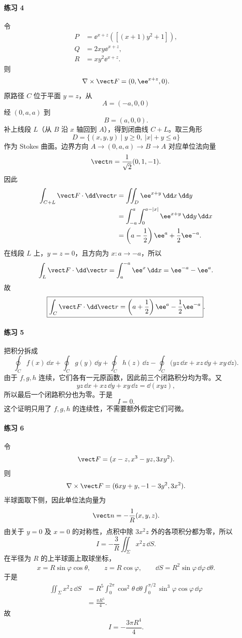 \paragraph{练习 4}
\begin{xsolution}
令
\[
\begin{aligned}
P&=\ee^{x+z}([(x+1)y^2+1]),\\
Q&=2xy\ee^{x+z},\\
R&=xy^2\ee^{x+z}.
\end{aligned}
\]
则
\[
  \nabla\times\vect F=(0,\ee^{x+z},0).
\]
原路径 $C$ 位于平面 $y=z$，从
\[
  A=(-a,0,0)
\]
经 $(0,a,a)$ 到
\[
  B=(a,0,0).
\]
补上线段 $L$（从 $B$ 沿 $x$ 轴回到 $A$），得到闭曲线 $C+L$。取三角形
\[
  D=\{(x,y,y)\mid y\ge0,\ |x|+y\le a\}
\]
作为 Stokes 曲面。边界方向 $A\to(0,a,a)\to B\to A$ 对应单位法向量
\[
  \vect n=\frac1{\sqrt2}(0,1,-1).
\]
因此
\begin{align*}
\int_{C+L}\vect F\cdot\dd\vect r
&=\iint_D\ee^{x+y}\,\dd x\,\dd y\\
&=\int_{-a}^{a}\int_0^{a-|x|}\ee^{x+y}\,\dd y\,\dd x\\
&=\left(a-\frac12\right)\ee^a+\frac12\ee^{-a}.
\end{align*}
在线段 $L$ 上，$y=z=0$，且方向为 $x:a\to-a$，所以
\[
  \int_L\vect F\cdot\dd\vect r
  =\int_a^{-a}\ee^x\,\dd x=\ee^{-a}-\ee^a.
\]
故
\[
  \boxed{
  \int_C\vect F\cdot\dd\vect r
  =\left(a+\frac12\right)\ee^a-\frac12\ee^{-a}}.
\]
\end{xsolution}

\paragraph{练习 5}
\begin{xsolution}
把积分拆成
\[
\oint_C f(x)\,\dd x+\oint_C g(y)\,\dd y+\oint_C h(z)\,\dd z
-\oint_C\bigl(yz\,\dd x+xz\,\dd y+xy\,\dd z\bigr).
\]
由于 $f,g,h$ 连续，它们各有一元原函数，因此前三个闭路积分均为零。又
\[
  yz\,\dd x+xz\,\dd y+xy\,\dd z=\dd(xyz),
\]
所以最后一个闭路积分也为零。于是
\[
  \boxed{I=0}.
\]
这个证明只用了 $f,g,h$ 的连续性，不需要额外假定它们可微。
\end{xsolution}

\paragraph{练习 6}
\begin{xsolution}
令
\[
  \vect F=(x-z,x^3-yz,3xy^2).
\]
则
\[
  \nabla\times\vect F=(6xy+y,-1-3y^2,3x^2).
\]
半球面取下侧，因此单位法向量为
\[
  \vect n=-\frac1R(x,y,z).
\]
由关于 $y=0$ 及 $x=0$ 的对称性，点积中除 $3x^2z$ 外的各项积分都为零，所以
\[
I=-\frac3R\iint_\Sigma x^2z\,\dd S.
\]
在半径为 $R$ 的上半球面上取球坐标，
\[
  x=R\sin\varphi\cos\theta,\qquad
  z=R\cos\varphi,\qquad
  \dd S=R^2\sin\varphi\,\dd\varphi\,\dd\theta.
\]
于是
\begin{align*}
\iint_\Sigma x^2z\,\dd S
&=R^5\int_0^{2\pi}\cos^2\theta\,\dd\theta
\int_0^{\pi/2}\sin^3\varphi\cos\varphi\,\dd\varphi\\
&=\frac{\pi R^5}{4}.
\end{align*}
故
\[
  \boxed{I=-\frac{3\pi R^4}{4}}.
\]
\end{xsolution}

